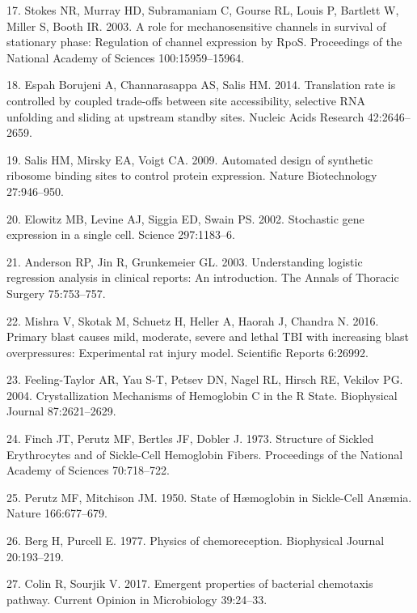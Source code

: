 \hypertarget{ref-stokes2003a}{}
17.
Stokes
NR,
Murray
HD,
Subramaniam
C,
Gourse
RL,
Louis
P,
Bartlett
W,
Miller
S,
Booth
IR.
2003.
A role
for
mechanosensitive
channels
in
survival
of
stationary
phase:
Regulation
of
channel
expression
by
RpoS.
Proceedings
of the
National
Academy
of
Sciences
100:15959--15964.

\hypertarget{ref-espahborujeni2014}{}
18.
Espah
Borujeni
A,
Channarasappa
AS,
Salis
HM.
2014.
Translation
rate
is
controlled
by
coupled
trade-offs
between
site
accessibility,
selective
RNA
unfolding
and
sliding
at
upstream
standby
sites.
Nucleic
Acids
Research
42:2646--2659.

\hypertarget{ref-salis2009}{}
19.
Salis
HM,
Mirsky
EA,
Voigt
CA.
2009.
Automated
design
of
synthetic
ribosome
binding
sites
to
control
protein
expression.
Nature
Biotechnology
27:946--950.

\hypertarget{ref-elowitz2002}{}
20.
Elowitz
MB,
Levine
AJ,
Siggia
ED,
Swain
PS.
2002.
Stochastic
gene
expression
in a
single
cell.
Science
297:1183--6.

\hypertarget{ref-anderson2003}{}
21.
Anderson
RP,
Jin R,
Grunkemeier
GL.
2003.
Understanding
logistic
regression
analysis
in
clinical
reports:
An
introduction.
The
Annals
of
Thoracic
Surgery
75:753--757.

\hypertarget{ref-mishra2016}{}
22.
Mishra
V,
Skotak
M,
Schuetz
H,
Heller
A,
Haorah
J,
Chandra
N.
2016.
Primary
blast
causes
mild,
moderate,
severe
and
lethal
TBI
with
increasing
blast
overpressures:
Experimental
rat
injury
model.
Scientific
Reports
6:26992.

\hypertarget{ref-feeling-taylor2004}{}
23.
Feeling-Taylor
AR,
Yau
S-T,
Petsev
DN,
Nagel
RL,
Hirsch
RE,
Vekilov
PG.
2004.
Crystallization
Mechanisms
of
Hemoglobin
C in
the R
State.
Biophysical
Journal
87:2621--2629.

\hypertarget{ref-finch1973}{}
24.
Finch
JT,
Perutz
MF,
Bertles
JF,
Dobler
J.
1973.
Structure
of
Sickled
Erythrocytes
and of
Sickle-Cell
Hemoglobin
Fibers.
Proceedings
of the
National
Academy
of
Sciences
70:718--722.

\hypertarget{ref-perutz1950}{}
25.
Perutz
MF,
Mitchison
JM.
1950.
State
of
Hæmoglobin
in
Sickle-Cell
Anæmia.
Nature
166:677--679.

\hypertarget{ref-berg1977}{}
26.
Berg
H,
Purcell
E.
1977.
Physics
of
chemoreception.
Biophysical
Journal
20:193--219.

\hypertarget{ref-colin2017}{}
27.
Colin
R,
Sourjik
V.
2017.
Emergent
properties
of
bacterial
chemotaxis
pathway.
Current
Opinion
in
Microbiology
39:24--33.

